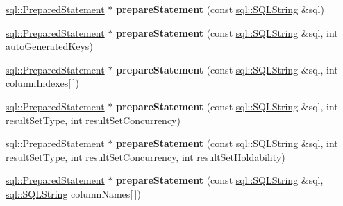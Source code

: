 \begin{DoxyCompactItemize}
\hyperlink{classsql_1_1_prepared_statement}{sql\+::\+Prepared\+Statement} $\ast$ {\bfseries prepare\+Statement} (const \hyperlink{classsql_1_1_s_q_l_string}{sql\+::\+S\+Q\+L\+String} \&sql)
\item 
\hypertarget{classsql_1_1mysql_1_1_my_s_q_l___connection_a4b341cf31b1fadb55fa573d5fc570de7}{}\label{classsql_1_1mysql_1_1_my_s_q_l___connection_a4b341cf31b1fadb55fa573d5fc570de7} 
\hyperlink{classsql_1_1_prepared_statement}{sql\+::\+Prepared\+Statement} $\ast$ {\bfseries prepare\+Statement} (const \hyperlink{classsql_1_1_s_q_l_string}{sql\+::\+S\+Q\+L\+String} \&sql, int auto\+Generated\+Keys)
\item 
\hypertarget{classsql_1_1mysql_1_1_my_s_q_l___connection_a02a26ce23b897f09189ddafd4b87849e}{}\label{classsql_1_1mysql_1_1_my_s_q_l___connection_a02a26ce23b897f09189ddafd4b87849e} 
\hyperlink{classsql_1_1_prepared_statement}{sql\+::\+Prepared\+Statement} $\ast$ {\bfseries prepare\+Statement} (const \hyperlink{classsql_1_1_s_q_l_string}{sql\+::\+S\+Q\+L\+String} \&sql, int column\+Indexes\mbox{[}$\,$\mbox{]})
\item 
\hypertarget{classsql_1_1mysql_1_1_my_s_q_l___connection_afcddea07aca0542a2a6e814ba1ee4bd6}{}\label{classsql_1_1mysql_1_1_my_s_q_l___connection_afcddea07aca0542a2a6e814ba1ee4bd6} 
\hyperlink{classsql_1_1_prepared_statement}{sql\+::\+Prepared\+Statement} $\ast$ {\bfseries prepare\+Statement} (const \hyperlink{classsql_1_1_s_q_l_string}{sql\+::\+S\+Q\+L\+String} \&sql, int result\+Set\+Type, int result\+Set\+Concurrency)
\item 
\hypertarget{classsql_1_1mysql_1_1_my_s_q_l___connection_a156ab360753b8b1ca11682422d9914b3}{}\label{classsql_1_1mysql_1_1_my_s_q_l___connection_a156ab360753b8b1ca11682422d9914b3} 
\hyperlink{classsql_1_1_prepared_statement}{sql\+::\+Prepared\+Statement} $\ast$ {\bfseries prepare\+Statement} (const \hyperlink{classsql_1_1_s_q_l_string}{sql\+::\+S\+Q\+L\+String} \&sql, int result\+Set\+Type, int result\+Set\+Concurrency, int result\+Set\+Holdability)
\item 
\hypertarget{classsql_1_1mysql_1_1_my_s_q_l___connection_a27a07ce9777574a0592fe6f8834e082f}{}\label{classsql_1_1mysql_1_1_my_s_q_l___connection_a27a07ce9777574a0592fe6f8834e082f} 
\hyperlink{classsql_1_1_prepared_statement}{sql\+::\+Prepared\+Statement} $\ast$ {\bfseries prepare\+Statement} (const \hyperlink{classsql_1_1_s_q_l_string}{sql\+::\+S\+Q\+L\+String} \&sql, \hyperlink{classsql_1_1_s_q_l_string}{sql\+::\+S\+Q\+L\+String} column\+Names\mbox{[}$\,$\mbox{]})
\item 

\end{DoxyCompactItemize}
